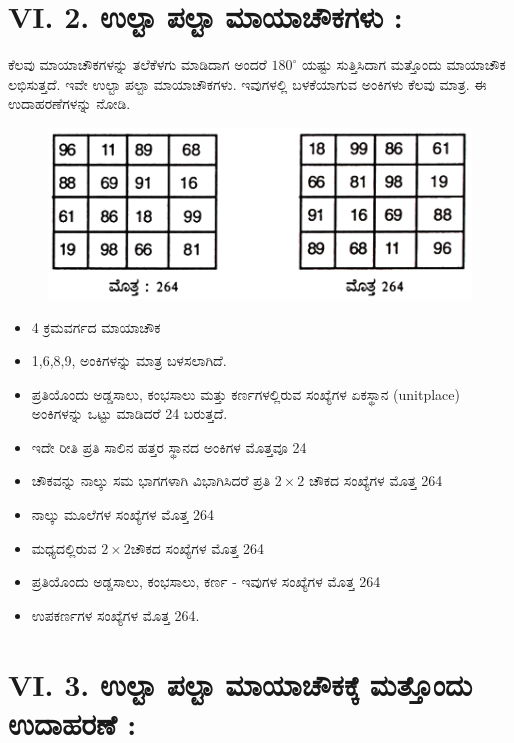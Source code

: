 \section*{VI. 2. ಉಲ್ಟಾ ಪಲ್ಟಾ ಮಾಯಾಚೌಕಗಳು :}

ಕೆಲವು ಮಾಯಾಚೌಕಗಳನ್ನು ತಲೆಕೆಳಗು ಮಾಡಿದಾಗ ಅಂದರೆ $180^\circ$ ಯಷ್ಟು ಸುತ್ತಿಸಿದಾಗ ಮತ್ತೊಂದು ಮಾಯಾಚೌಕ ಲಭಿಸುತ್ತದೆ. ಇವೇ ಉಲ್ಟಾ ಪಲ್ಟಾ ಮಾಯಾಚೌಕಗಳು. ಇವುಗಳಲ್ಲಿ ಬಳಕೆಯಾಗುವ ಅಂಕಿಗಳು ಕೆಲವು ಮಾತ್ರ. ಈ ಉದಾಹರಣೆಗಳನ್ನು ನೋಡಿ.
\begin{figure}[H]
\includegraphics{src/figures/chap5/fig5-2.jpg}
\end{figure}
\begin{itemize}
	\item 4 ಕ್ರಮವರ್ಗದ ಮಾಯಾಚೌಕ
	\item 1,6,8,9, ಅಂಕಿಗಳನ್ನು ಮಾತ್ರ ಬಳಸಲಾಗಿದೆ.
	\item ಪ್ರತಿಯೊಂದು ಅಡ್ಡಸಾಲು, ಕಂಭಸಾಲು ಮತ್ತು ಕರ್ಣಗಳಲ್ಲಿರುವ ಸಂಖ್ಯೆಗಳ ಏಕಸ್ಥಾನ (unitplace) ಅಂಕಿಗಳನ್ನು ಒಟ್ಟು ಮಾಡಿದರೆ 24 ಬರುತ್ತದೆ.
	\item ಇದೇ ರೀತಿ ಪ್ರತಿ ಸಾಲಿನ ಹತ್ತರ ಸ್ಥಾನದ ಅಂಕಿಗಳ ಮೊತ್ತವೂ 24
	\item ಚೌಕವನ್ನು ನಾಲ್ಕು ಸಮ ಭಾಗಗಳಾಗಿ ವಿಭಾಗಿಸಿದರೆ ಪ್ರತಿ $2 \times 2$ ಚೌಕದ ಸಂಖ್ಯೆಗಳ ಮೊತ್ತ 264
	\item ನಾಲ್ಕು ಮೂಲೆಗಳ ಸಂಖ್ಯೆಗಳ ಮೊತ್ತ 264
	\item ಮಧ್ಯದಲ್ಲಿರುವ $2 \times 2$ಚೌಕದ ಸಂಖ್ಯೆಗಳ ಮೊತ್ತ 264
	\item ಪ್ರತಿಯೊಂದು ಅಡ್ಡಸಾಲು, ಕಂಭಸಾಲು, ಕರ್ಣ - ಇವುಗಳ ಸಂಖ್ಯೆಗಳ ಮೊತ್ತ 264
	\item ಉಪಕರ್ಣಗಳ ಸಂಖ್ಯೆಗಳ ಮೊತ್ತ 264.
\end{itemize}

\section*{VI. 3. ಉಲ್ಟಾ ಪಲ್ಟಾ ಮಾಯಾಚೌಕಕ್ಕೆ ಮತ್ತೊಂದು ಉದಾಹರಣೆ :}

